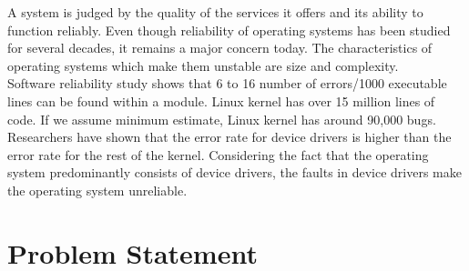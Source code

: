 A system is judged by the quality of the services it offers and its ability to function reliably. Even though reliability of operating systems has been studied for several decades, it remains a major concern today. The characteristics of operating systems which make them unstable are size and complexity. 
\\
Software reliability study shows that 6 to 16 number of errors/1000 executable lines can be found within a module\cite{Basili:1984:SEC:69605.2085, Tanenbaum06canwe}. Linux kernel has over 15 million lines of code. If we assume minimum estimate, Linux kernel has around 90,000 bugs. Researchers have shown that the error rate for device drivers is higher than the error rate for the rest of the kernel\cite{Chou:2001:ESO:502034.502042}. Considering the fact that the operating system predominantly consists of device drivers, the faults in device drivers make the operating system unreliable\cite{Chou:2001:ESO:502034.502042}.

\pagebreak

\section {Problem Statement}

